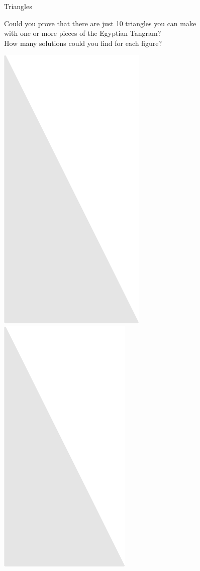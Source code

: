 \documentclass[14pt]{beamer}
\begin{document}

    \begin{frame}{Triangles}

        \vspace{-0.5em}
        \begin{center}
            {\small Could you prove that there are just 10 triangles you can make\\with one or more pieces of the Egyptian Tangram?\\How many solutions could you find for each figure?}

            \bigskip\bigskip

            \includegraphics[scale=0.3]{figures/figure024f.pdf}\quad
            \includegraphics[scale=0.3]{figures/figure024e.pdf}\quad

\end{center}
\end{frame}
\end{document}

